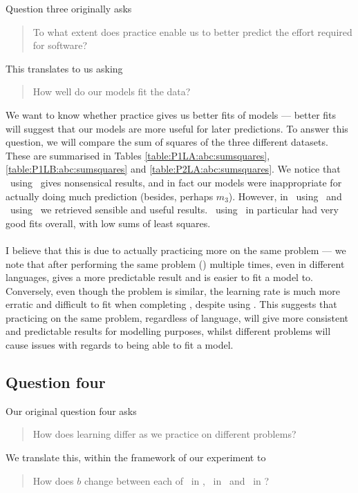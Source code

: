 Question three originally asks
\begin{quote}
  To what extent does practice enable us to better predict the effort required
  for software?
\end{quote}

This translates to us asking
\begin{quote}
  How well do our models fit the data?
\end{quote}

We want to know whether practice gives us better fits of models --- better fits
will suggest that our models are more useful for later predictions.
To answer this question, we will compare the sum of squares of the three
different datasets.
These are summarised in Tables \ref{table:P1LA:abc:sumsquares},
\ref{table:P1LB:abc:sumsquares} and \ref{table:P2LA:abc:sumsquares}.
We notice that \PO\ using \LA\ gives nonsensical results, and in fact our models
were inappropriate for actually doing much prediction (besides, perhaps $m_3$).
However, in \PT\ using \LA\ and \PO\ using \LB\ we retrieved sensible and useful
results.
\PO\ using \LB\ in particular had very good fits overall, with low sums of least
squares.\\
\\
I believe that this is due to actually practicing more on the same problem ---
we note that after performing the same problem (\PO) multiple times, even in
different languages, gives a more predictable result and is easier to fit a
model to.
Conversely, even though the problem is similar, the learning rate is much more
erratic and difficult to fit when completing \PT, despite using \LA.
This suggests that practicing on the same problem, regardless of language, will give more
consistent and predictable results for modelling purposes, whilst different
problems will cause issues with regards to being able to fit a model.

\subsection{Question four}

Our original question four asks
\begin{quote}
  How does learning differ as we practice on different problems? 
\end{quote}

We translate this, within the framework of our experiment to
\begin{quote}
   How does $b$ change between each of \PO\ in \LA, \PO\ in
   \LB\ and \PT\ in \LA?
\end{quote}

